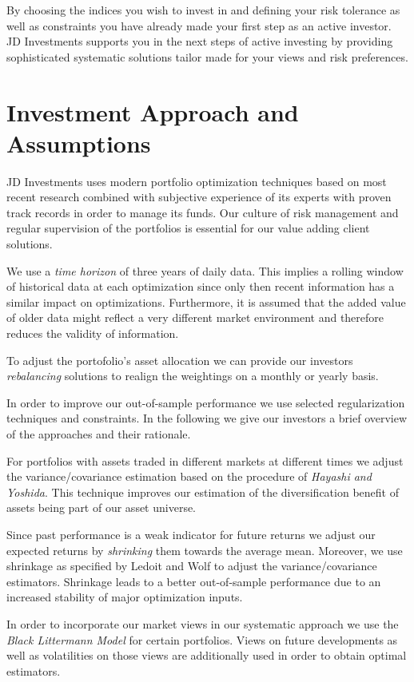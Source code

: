 \documentclass[11pt, parskip=full, DIV=14, headings=small, footsepline, footinclude=false, headsepline]{scrreprt}
\begin{document}
By choosing the indices you wish to invest in and defining your risk tolerance as well as constraints you have already made your first step as an active investor.
JD Investments supports you in the next steps of active investing by providing sophisticated systematic solutions tailor made for your views and risk preferences.

 
\section{Investment Approach and Assumptions}
JD Investments uses modern portfolio optimization techniques based on most recent research combined with subjective experience of its experts with proven track records in order to manage its funds.
Our culture of risk management and regular supervision of the portfolios is essential for our value adding client solutions.

We use a \textit{time horizon} of three years of daily data.
This implies a rolling window of historical data at each optimization since only then recent information has a similar impact on optimizations.
Furthermore, it is assumed that the added value of older data might reflect a very different market environment and therefore reduces the validity of information.

To adjust the portofolio’s asset allocation we can provide our investors \textit{rebalancing} solutions to realign the weightings on a monthly or yearly basis.

In order to improve our out-of-sample performance we use selected regularization techniques and constraints.
In the following we give our investors a brief overview of the approaches and their rationale.
 
For portfolios with assets traded in different markets at different times we adjust the variance/covariance estimation based on the procedure of \textit{Hayashi and Yoshida}.
This technique improves our estimation of the diversification benefit of assets being part of our asset universe.

Since past performance is a weak indicator for future returns we adjust our expected returns by \textit{shrinking} them towards the average mean.
Moreover, we use shrinkage as specified by Ledoit and Wolf to adjust the variance/covariance estimators.
Shrinkage leads to a better out-of-sample performance due to an increased stability of major optimization inputs.

In order to incorporate our market views in our systematic approach we use the \textit{Black Littermann Model} for certain portfolios.
Views on future developments as well as volatilities on those views are additionally used in order to obtain optimal estimators.
\end{document}
